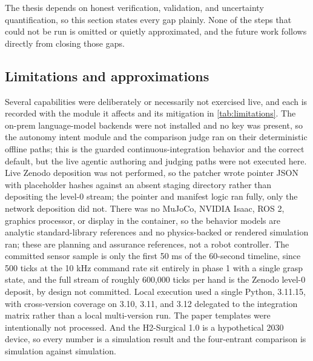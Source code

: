 
The thesis depends on honest verification, validation, and uncertainty
quantification, so this section states every gap plainly. None of the steps that
could not be run is omitted or quietly approximated, and the future work follows
directly from closing those gaps.

\subsection{Limitations and approximations}

Several capabilities were deliberately or necessarily not exercised live, and
each is recorded with the module it affects and its mitigation in
\autoref{tab:limitations}. The on-prem language-model backends were not installed
and no key was present, so the autonomy intent module and the comparison judge
ran on their deterministic offline paths; this is the guarded
continuous-integration behavior and the correct default, but the live agentic
authoring and judging paths were not executed here. Live Zenodo deposition was
not performed, so the patcher wrote pointer JSON with placeholder hashes against
an absent staging directory rather than depositing the level-0 stream; the
pointer and manifest logic ran fully, only the network deposition did not. There
was no MuJoCo, NVIDIA Isaac, ROS 2, graphics processor, or display in the
container, so the behavior models are analytic standard-library references and no
physics-backed or rendered simulation ran; these are planning and assurance
references, not a robot controller. The committed sensor sample is only the first
50 ms of the 60-second timeline, since 500 ticks at the 10 kHz command rate sit
entirely in phase 1 with a single grasp state, and the full stream of roughly
600,000 ticks per hand is the Zenodo level-0 deposit, by design not committed.
Local execution used a single Python, 3.11.15, with cross-version coverage on
3.10, 3.11, and 3.12 delegated to the integration matrix rather than a local
multi-version run. The paper templates were intentionally not processed. And the
H2-Surgical 1.0 is a hypothetical 2030 device, so every number is a simulation
result and the four-entrant comparison is simulation against simulation.

